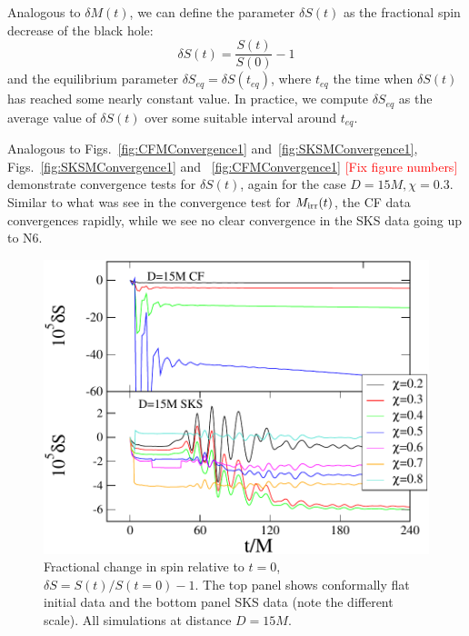 \documentclass[aps,prd,amsmath,floatfix,twocolumn,superscriptaddress,nofootinbib,showpacs]{revtex4-1}
\theoremstyle{plain}
\theoremstyle{definition}
\newcommand{\red}[1]{\textcolor{Red}{#1}}
\begin{document}
Analogous to $\delta M(t)$, we can define the parameter $\delta S(t)$ as the
fractional spin decrease of the black hole:
\begin{equation}
\delta S(t)=\frac{S(t)}{S(0)} - 1
\end{equation}
and the equilibrium parameter $\delta S_{eq}=\delta S(t_{eq})$, where $t_{eq}$ the
time when $\delta S(t)$ has reached some nearly constant value.
In practice, we compute $\delta S_{eq}$ as the average value of
$\delta S(t)$
over some suitable interval around $t_{eq}$.

Analogous to Figs.~\ref{fig:CFMConvergence1}
and~\ref{fig:SKSMConvergence1}, Figs.~\ref{fig:SKSMConvergence1} and
~\ref{fig:CFMConvergence1} \red{[Fix figure numbers]} demonstrate convergence tests for $\delta
S(t)$, again for the case $D=15M, \chi=0.3$. Similar to what was see
in the convergence test for $M_{\rm irr}(t)$, the CF data convergences
rapidly, while we see no clear convergence in the SKS data going up to N6.

\begin{figure}
\includegraphics[width=0.99\columnwidth]{SvsT2}
\caption{Fractional change in spin relative to $t=0$, $\delta S = S(t)/S(t=0)-1$.  The top panel shows conformally flat initial data and the bottom panel SKS data (note the different scale).  All simulations at distance $D=15M$.}
\label{fig:SvsT2}
\end{figure}
\end{document}
